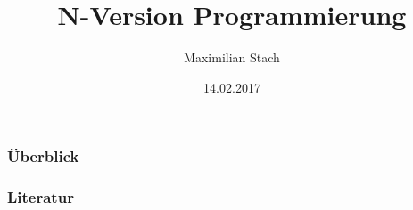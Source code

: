 \documentclass{beamer}
\title[N-Version Programmierung]{N-Version Programmierung} %
\author{Maximilian Stach} %
\institute[TU Dortmund] %
{
Technische Universität Dortmund \\ %
\medskip
}
\date{14.02.2017} %
\begin{document}
\begin{frame}
\titlepage %
\end{frame}

\begin{frame}
\frametitle{Überblick} %
\tableofcontents %
\end{frame}






%

\begin{frame}[allowframebreaks]
	\frametitle{Literatur}
	
	
\end{frame}

%
\end{document}
